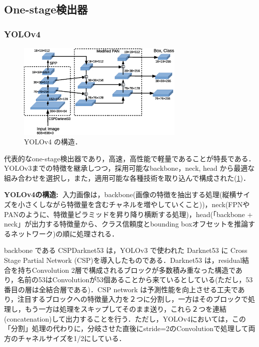 \documentclass[originalpaper]{jsaiart}     %
\begin{document}
\subsection{One-stage検出器}
\subsubsection{YOLOv4}
\begin{figure}[tb]
    \begin{center}
        \includegraphics[width=8cm,clip]{fig/archi_YOLOv4.eps}
    \end{center}
    \caption{ YOLOv4 の構造．}
    \label{fig:archi_YOLOv4}
\end{figure}
代表的なone-stage検出器であり，高速，高性能で軽量であることが特長である\cite{BWL20}．YOLOv3までの特徴を継承しつつ，採用可能なbackbone，neck, head から最適な組み合わせを選択し，また，適用可能な各種技術を取り込んで構成された(\ref{fig:archi_YOLOv4})．

{\bf YOLOv4の構造:\ }入力画像は，backbone(画像の特徴を抽出する処理(縦横サイズを小さくしながら特徴量を含むチャネルを増やしていくこと))，neck(FPNやPANのように、特徴量ピラミッドを昇り降り横断する処理)，head(「backbone + neck」が出力する特徴量から、クラス信頼度とbounding boxオフセットを推論するネットワーク)の順に処理される．

backbone である CSPDarknet53 は，YOLOv3 で使われた Darknet53 に Cross Stage Partial Network (CSP)を導入したものである．Darknet53 は，residual結合を持ちConvolution 2層で構成されるブロックが多数積み重なった構造であり，名前の53はConvolutionが53個あることから来ているとしている(ただし，53番目の層は全結合層である)．CSP network は予測性能を向上させる工夫であり，注目するブロックへの特徴量入力を２つに分割し，一方はそのブロックで処理し，もう一方は処理をスキップしてそのまま送り，これら２つを連結(concatenation)して出力することを行う．ただし，YOLOv4においては，この「分割」処理の代わりに，分岐させた直後にstride=2のConvolutionで処理して両方のチャネルサイズを1/2にしている．
\end{document}
